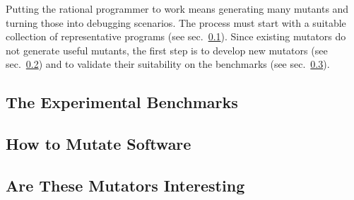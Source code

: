 
Putting the rational programmer to work means generating many mutants and turning
those into debugging scenarios. The process must start with a suitable
collection of representative programs (see sec.~\ref{sub:mutate-benchmarks}).
Since existing mutators do not generate useful mutants, the first step is to
develop new mutators (see sec.~\ref{sub:mutate-mutators}) and to validate their
suitability on the benchmarks (see sec.~\ref{sub:mutate-interesting}).


\def\sub#1#2{\subsection{#2} \label{sub:mutate-#1} }


\sub{benchmarks}{The Experimental Benchmarks}

\sub{mutators}   {How to Mutate Software} 
\sub{interesting}{Are These Mutators Interesting} 
